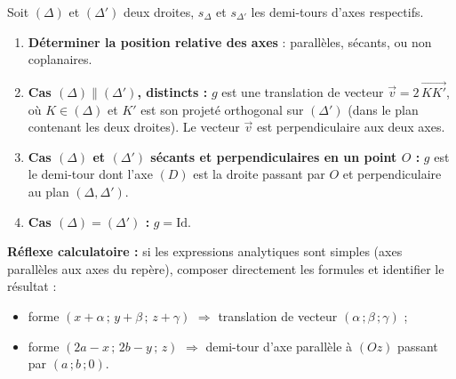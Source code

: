 \documentclass[11pt]{article}
\newcommand{\cle}[1]{{\popxbold\color{popdark}#1}}
\begin{document}
\begin{methode}[Nature de la composée $g=s_{\Delta'}\circ s_{\Delta}$]
Soit $(\Delta)$ et $(\Delta')$ deux droites, $s_{\Delta}$ et $s_{\Delta'}$ les demi-tours d'axes respectifs.
\begin{enumerate}
\item \textbf{Déterminer la position relative des axes} : parallèles, sécants, ou non coplanaires.
\item \textbf{Cas $(\Delta)\parallel(\Delta')$, distincts :} $g$ est une \cle{translation} de vecteur $\vec{v}=2\,\overrightarrow{KK'}$, où $K\in(\Delta)$ et $K'$ est son projeté orthogonal sur $(\Delta')$ (dans le plan contenant les deux droites). Le vecteur $\vec{v}$ est perpendiculaire aux deux axes.
\item \textbf{Cas $(\Delta)$ et $(\Delta')$ sécants et perpendiculaires en un point $O$ :} $g$ est le \cle{demi-tour} dont l'axe $(D)$ est la droite passant par $O$ et perpendiculaire au plan $(\Delta,\Delta')$.
\item \textbf{Cas $(\Delta)=(\Delta')$ :} $g=\mathrm{Id}$.
\end{enumerate}
\textbf{Réflexe calculatoire :} si les expressions analytiques sont simples (axes parallèles aux axes du repère), composer directement les formules et identifier le résultat :
\begin{itemize}
\item forme $(x+\alpha\,;\,y+\beta\,;\,z+\gamma)$ $\Rightarrow$ translation de vecteur $(\alpha\,;\beta\,;\gamma)$ ;
\item forme $(2a-x\,;\,2b-y\,;\,z)$ $\Rightarrow$ demi-tour d'axe parallèle à $(Oz)$ passant par $(a\,;b\,;0)$.
\end{itemize}
\end{methode}
\end{document}

